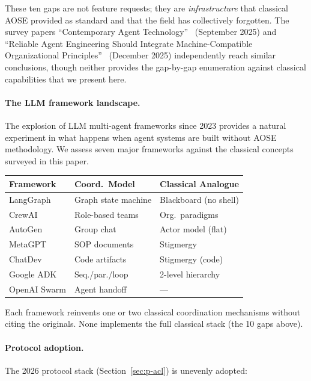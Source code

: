 \documentclass{article}
\begin{document}
\noindent
These ten gaps are not feature requests; they are \emph{infrastructure} that classical
AOSE provided as standard and that the field has collectively forgotten. The survey papers
``Contemporary Agent Technology''~\citep{contemporary2025} (September 2025) and
``Reliable Agent Engineering Should Integrate Machine-Compatible Organizational
Principles''~\citep{reliableagent2025} (December 2025) independently reach similar
conclusions, though neither provides the gap-by-gap enumeration against classical
capabilities that we present here.

\paragraph{The LLM framework landscape.}
\label{sec:p-frameworks}
The explosion of LLM multi-agent frameworks since 2023 provides a natural experiment
in what happens when agent systems are built without AOSE methodology. We assess
seven major frameworks against the classical concepts surveyed in this paper.

\begin{center}
\small
\begin{tabular}{@{} p{1.8cm} p{2cm} p{2.5cm} @{}}
\toprule
\textbf{Framework} & \textbf{Coord.\ Model} & \textbf{Classical Analogue} \\
\midrule
LangGraph & Graph state machine & Blackboard (no shell) \\
CrewAI & Role-based teams & Org.\ paradigms \\
AutoGen & Group chat & Actor model (flat) \\
MetaGPT & SOP documents & Stigmergy \\
ChatDev & Code artifacts & Stigmergy (code) \\
Google ADK & Seq./par./loop & 2-level hierarchy \\
OpenAI Swarm & Agent handoff & --- \\
\bottomrule
\end{tabular}
\end{center}

\noindent
Each framework reinvents one or two classical coordination
mechanisms without citing the originals. None implements the full classical stack
(the 10 gaps above).

\paragraph{Protocol adoption.}
The 2026 protocol stack (Section~\ref{sec:p-acl}) is unevenly adopted:
\end{document}
